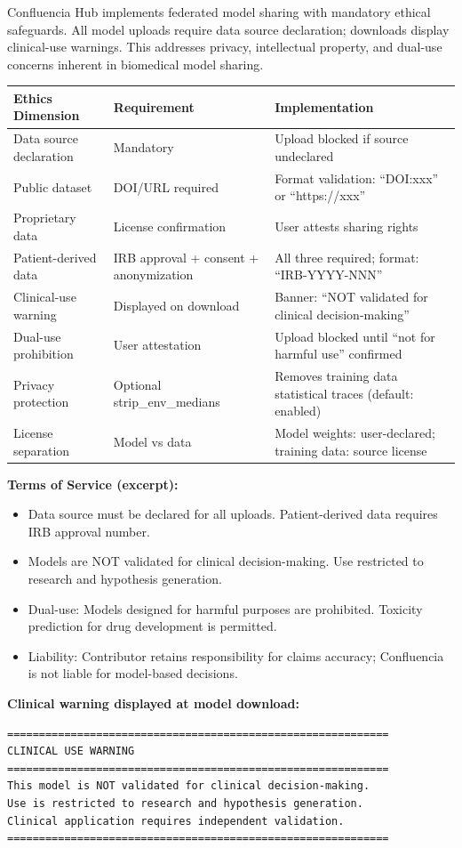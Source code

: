 \small Confluencia Hub implements federated model sharing with mandatory ethical safeguards. All model uploads require data source declaration; downloads display clinical-use warnings. This addresses privacy, intellectual property, and dual-use concerns inherent in biomedical model sharing.

\begin{tabular}{llp{8cm}}
\toprule
\textbf{Ethics Dimension} & \textbf{Requirement} & \textbf{Implementation} \\
\midrule
Data source declaration & Mandatory & Upload blocked if source undeclared \\
Public dataset & DOI/URL required & Format validation: ``DOI:xxx'' or ``https://xxx'' \\
Proprietary data & License confirmation & User attests sharing rights \\
Patient-derived data & IRB approval + consent + anonymization & All three required; format: ``IRB-YYYY-NNN'' \\
Clinical-use warning & Displayed on download & Banner: ``NOT validated for clinical decision-making'' \\
Dual-use prohibition & User attestation & Upload blocked until ``not for harmful use'' confirmed \\
Privacy protection & Optional strip\_env\_medians & Removes training data statistical traces (default: enabled) \\
License separation & Model vs data & Model weights: user-declared; training data: source license \\
\bottomrule
\end{tabular}

\textbf{Terms of Service (excerpt):}
\begin{itemize}[noitemsep,topsep=0pt]
\item Data source must be declared for all uploads. Patient-derived data requires IRB approval number.
\item Models are NOT validated for clinical decision-making. Use restricted to research and hypothesis generation.
\item Dual-use: Models designed for harmful purposes are prohibited. Toxicity prediction for drug development is permitted.
\item Liability: Contributor retains responsibility for claims accuracy; Confluencia is not liable for model-based decisions.
\end{itemize}

\textbf{Clinical warning displayed at model download:}
\begin{verbatim}
============================================================
CLINICAL USE WARNING
============================================================
This model is NOT validated for clinical decision-making.
Use is restricted to research and hypothesis generation.
Clinical application requires independent validation.
============================================================
\end{verbatim}

